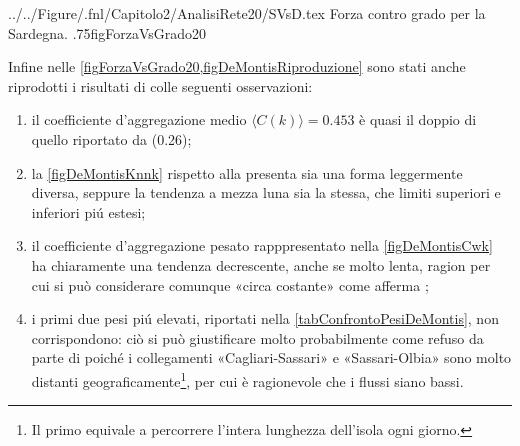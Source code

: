             {../../Figure/.fnl/Capitolo2/AnalisiRete20/SVsD.tex}
            {Forza contro grado per la Sardegna.}
            {.75\linewidth}{figForzaVsGrado20}

        Infine nelle \cref{figForzaVsGrado20,figDeMontisRiproduzione} sono stati anche riprodotti i risultati di \cite{DeMontis2007} colle seguenti osservazioni:

        \begin{enumerate}[
            label=\arabic*.,
            topsep=0.5em,
            parsep=0em,
            itemsep=0.25em,
            leftmargin=2em,
            rightmargin=1.5em,
        ]
            \item il coefficiente d'aggregazione medio \(\langle C(k)\rangle=0.453\) è quasi il doppio di quello riportato da \cite[p. 911]{DeMontis2007} (0.26);
            \item la \cref{figDeMontisKnnk} rispetto alla \cite[Fig. 3b]{DeMontis2007} presenta sia una forma leggermente diversa, seppure la tendenza a mezza luna sia la stessa, che limiti superiori e inferiori piú estesi;
            \item il coefficiente d'aggregazione pesato rapppresentato nella \cref{figDeMontisCwk} ha chiaramente una tendenza decrescente, anche se molto lenta, ragion per cui si può considerare comunque «circa costante» come afferma \cite{DeMontis2007};
            \item i primi due pesi piú elevati, riportati nella \cref{tabConfrontoPesiDeMontis}, non corrispondono: ciò si può giustificare molto probabilmente come refuso da parte di \cite{DeMontis2007} poiché i collegamenti «Cagliari-Sassari» e «Sassari-Olbia» sono molto distanti geograficamente\footnote{Il primo equivale a percorrere l'intera lunghezza dell'isola ogni giorno.}, per cui è ragionevole che i flussi siano bassi.
        \end{enumerate}


